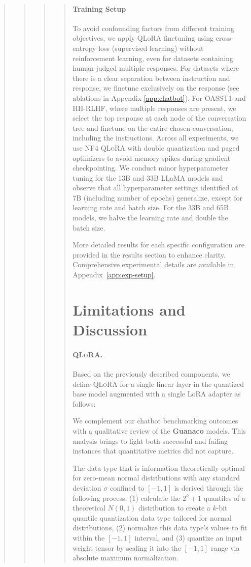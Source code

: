 \begin{quote}
\begin{quote}
\begin{quote}
\begin{quote}
\paragraph{Training Setup} To avoid confounding factors from different training objectives, we apply QLoRA finetuning using cross-entropy loss (supervised learning) without reinforcement learning, even for datasets containing human-judged multiple responses. For datasets where there is a clear separation between instruction and response, we finetune exclusively on the response (see ablations in Appendix \ref{app:chatbot}). For OASST1 and HH-RLHF, where multiple responses are present, we select the top response at each node of the conversation tree and finetune on the entire chosen conversation, including the instructions. Across all experiments, we use NF4 \textsc{QLoRA} with double quantization and paged optimizers to avoid memory spikes during gradient checkpointing. We conduct minor hyperparameter tuning for the 13B and 33B LLaMA models and observe that all hyperparameter settings identified at 7B (including number of epochs) generalize, except for learning rate and batch size. For the 33B and 65B models, we halve the learning rate and double the batch size.

More detailed results for each specific configuration are provided in the results section to enhance clarity. Comprehensive experimental details are available in Appendix~\ref{app:exp-setup}.

\section{Limitations and Discussion}

\paragraph{\textsc{QLoRA}.} Based on the previously described components, we define \textsc{QLoRA} for a single linear layer in the quantized base model augmented with a single LoRA adapter as follows:

We complement our chatbot benchmarking outcomes with a qualitative review of the \textbf{Guanaco} models. This analysis brings to light both successful and failing instances that quantitative metrics did not capture.

The data type that is information-theoretically optimal for zero-mean normal distributions with any standard deviation $\sigma$ confined to $[-1, 1]$ is derived through the following process: (1) calculate the $2^k+1$ quantiles of a theoretical $N(0, 1)$ distribution to create a $k$-bit quantile quantization data type tailored for normal distributions, (2) normalize this data type’s values to fit within the $[-1, 1]$ interval, and (3) quantize an input weight tensor by scaling it into the $[-1, 1]$ range via absolute maximum normalization.


\end{quote}
\end{quote}
\end{quote}
\end{quote}
